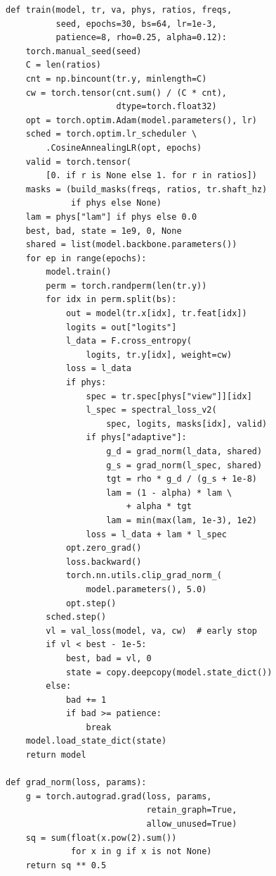 \documentclass[conference]{IEEEtran}
\begin{document}
\begin{lstlisting}[caption={Training loop shared by all neural models (baseline: \texttt{phys=None}).},label={lst:train}]
def train(model, tr, va, phys, ratios, freqs,
          seed, epochs=30, bs=64, lr=1e-3,
          patience=8, rho=0.25, alpha=0.12):
    torch.manual_seed(seed)
    C = len(ratios)
    cnt = np.bincount(tr.y, minlength=C)
    cw = torch.tensor(cnt.sum() / (C * cnt),
                      dtype=torch.float32)
    opt = torch.optim.Adam(model.parameters(), lr)
    sched = torch.optim.lr_scheduler \
        .CosineAnnealingLR(opt, epochs)
    valid = torch.tensor(
        [0. if r is None else 1. for r in ratios])
    masks = (build_masks(freqs, ratios, tr.shaft_hz)
             if phys else None)
    lam = phys["lam"] if phys else 0.0
    best, bad, state = 1e9, 0, None
    shared = list(model.backbone.parameters())
    for ep in range(epochs):
        model.train()
        perm = torch.randperm(len(tr.y))
        for idx in perm.split(bs):
            out = model(tr.x[idx], tr.feat[idx])
            logits = out["logits"]
            l_data = F.cross_entropy(
                logits, tr.y[idx], weight=cw)
            loss = l_data
            if phys:
                spec = tr.spec[phys["view"]][idx]
                l_spec = spectral_loss_v2(
                    spec, logits, masks[idx], valid)
                if phys["adaptive"]:
                    g_d = grad_norm(l_data, shared)
                    g_s = grad_norm(l_spec, shared)
                    tgt = rho * g_d / (g_s + 1e-8)
                    lam = (1 - alpha) * lam \
                        + alpha * tgt
                    lam = min(max(lam, 1e-3), 1e2)
                loss = l_data + lam * l_spec
            opt.zero_grad()
            loss.backward()
            torch.nn.utils.clip_grad_norm_(
                model.parameters(), 5.0)
            opt.step()
        sched.step()
        vl = val_loss(model, va, cw)  # early stop
        if vl < best - 1e-5:
            best, bad = vl, 0
            state = copy.deepcopy(model.state_dict())
        else:
            bad += 1
            if bad >= patience:
                break
    model.load_state_dict(state)
    return model

def grad_norm(loss, params):
    g = torch.autograd.grad(loss, params,
                            retain_graph=True,
                            allow_unused=True)
    sq = sum(float(x.pow(2).sum())
             for x in g if x is not None)
    return sq ** 0.5
\end{lstlisting}
\end{document}
